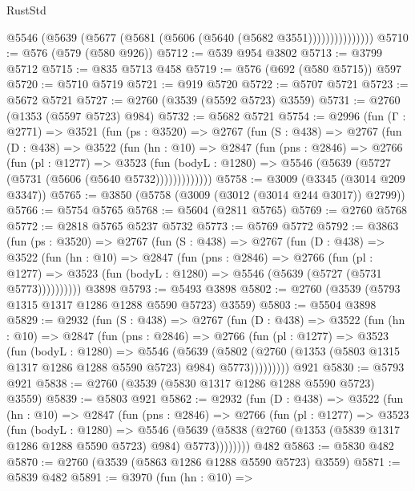 \begin{lexlean}{RustStd}
\begin{coremodule}
                    @5546 (@5639 (@5677 (@5681 (@5606 (@5640 (@5682 @3551)))))))))))))))
@5710 := @576 (@579 (@580 @926))
@5712 := @539 @954 @3802
@5713 := @3799 @5712
@5715 := @835 @5713 @458
@5719 := @576 (@692 (@580 @5715)) @597
@5720 := @5710 @5719
@5721 := @919 @5720
@5722 := @5707 @5721
@5723 := @5672 @5721
@5727 := @2760 (@3539 (@5592 @5723) @3559)
@5731 := @2760 (@1353 (@5597 @5723) @984)
@5732 := @5682 @5721
@5754 := @2996
    (fun (Γ : @2771) =>
    @3521
      (fun (ps : @3520) =>
      @2767
        (fun (S : @438) =>
        @2767
          (fun (D : @438) =>
          @3522
            (fun (hn : @10) =>
            @2847
              (fun (pns : @2846) =>
              @2766
                (fun (pl : @1277) =>
                @3523
                  (fun (bodyL : @1280) =>
                  @5546 (@5639 (@5727 (@5731 (@5606 (@5640 @5732)))))))))))))
@5758 := @3009 (@3345 (@3014 @209 @3347))
@5765 := @3850 (@5758 (@3009 (@3012 (@3014 @244 @3017)) @2799))
@5766 := @5754 @5765
@5768 := @5604 (@2811 @5765)
@5769 := @2760 @5768
@5772 := @2818 @5765 @5237 @5732
@5773 := @5769 @5772
@5792 := @3863
    (fun (ps : @3520) =>
    @2767
      (fun (S : @438) =>
      @2767
        (fun (D : @438) =>
        @3522
          (fun (hn : @10) =>
          @2847
            (fun (pns : @2846) =>
            @2766
              (fun (pl : @1277) =>
              @3523 (fun (bodyL : @1280) => @5546 (@5639 (@5727 (@5731 @5773))))))))))
    @3898
@5793 := @5493 @3898
@5802 := @2760 (@3539 (@5793 @1315 @1317 @1286 @1288 @5590 @5723) @3559)
@5803 := @5504 @3898
@5829 := @2932
    (fun (S : @438) =>
    @2767
      (fun (D : @438) =>
      @3522
        (fun (hn : @10) =>
        @2847
          (fun (pns : @2846) =>
          @2766
            (fun (pl : @1277) =>
            @3523
              (fun (bodyL : @1280) =>
              @5546
                (@5639
                  (@5802
                    (@2760 (@1353 (@5803 @1315 @1317 @1286 @1288 @5590 @5723) @984) @5773)))))))))
    @921
@5830 := @5793 @921
@5838 := @2760 (@3539 (@5830 @1317 @1286 @1288 @5590 @5723) @3559)
@5839 := @5803 @921
@5862 := @2932
    (fun (D : @438) =>
    @3522
      (fun (hn : @10) =>
      @2847
        (fun (pns : @2846) =>
        @2766
          (fun (pl : @1277) =>
          @3523
            (fun (bodyL : @1280) =>
            @5546
              (@5639 (@5838 (@2760 (@1353 (@5839 @1317 @1286 @1288 @5590 @5723) @984) @5773))))))))
    @482
@5863 := @5830 @482
@5870 := @2760 (@3539 (@5863 @1286 @1288 @5590 @5723) @3559)
@5871 := @5839 @482
@5891 := @3970
    (fun (hn : @10) =>

\end{coremodule}
\end{lexlean}
